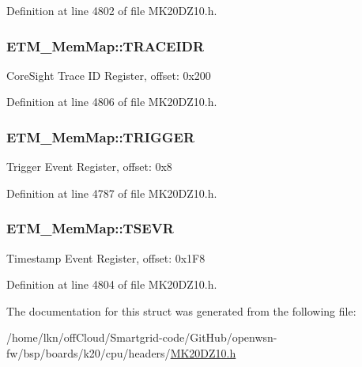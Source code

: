 Definition at line 4802 of file M\+K20\+D\+Z10.\+h.

\subsubsection[{\texorpdfstring{T\+R\+A\+C\+E\+I\+DR}{TRACEIDR}}]{ E\+T\+M\+\_\+\+Mem\+Map\+::\+T\+R\+A\+C\+E\+I\+DR}\hypertarget{struct_e_t_m___mem_map_a9f0f88f9e4c2bbb77d22f216cce40e7a}{}\label{struct_e_t_m___mem_map_a9f0f88f9e4c2bbb77d22f216cce40e7a}
Core\+Sight Trace ID Register, offset\+: 0x200 

Definition at line 4806 of file M\+K20\+D\+Z10.\+h.

\subsubsection[{\texorpdfstring{T\+R\+I\+G\+G\+ER}{TRIGGER}}]{ E\+T\+M\+\_\+\+Mem\+Map\+::\+T\+R\+I\+G\+G\+ER}\hypertarget{struct_e_t_m___mem_map_a0acebf95863ac9ae5ccbc9a87e48be62}{}\label{struct_e_t_m___mem_map_a0acebf95863ac9ae5ccbc9a87e48be62}
Trigger Event Register, offset\+: 0x8 

Definition at line 4787 of file M\+K20\+D\+Z10.\+h.

\subsubsection[{\texorpdfstring{T\+S\+E\+VR}{TSEVR}}]{ E\+T\+M\+\_\+\+Mem\+Map\+::\+T\+S\+E\+VR}\hypertarget{struct_e_t_m___mem_map_ad30bdaff018bc7d3b586ce0ca41dfd9b}{}\label{struct_e_t_m___mem_map_ad30bdaff018bc7d3b586ce0ca41dfd9b}
Timestamp Event Register, offset\+: 0x1\+F8 

Definition at line 4804 of file M\+K20\+D\+Z10.\+h.



The documentation for this struct was generated from the following file\+:\begin{DoxyCompactItemize}
\item 
/home/lkn/off\+Cloud/\+Smartgrid-\/code/\+Git\+Hub/openwsn-\/fw/bsp/boards/k20/cpu/headers/\hyperlink{_m_k20_d_z10_8h}{M\+K20\+D\+Z10.\+h}\end{DoxyCompactItemize}
